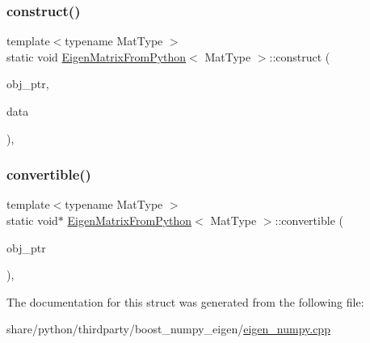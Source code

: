 \subsubsection{\texorpdfstring{construct()}{construct()}}
{\footnotesize\ttfamily template$<$typename Mat\+Type $>$ \\
static void \hyperlink{structEigenMatrixFromPython}{Eigen\+Matrix\+From\+Python}$<$ Mat\+Type $>$\+::construct (\begin{DoxyParamCaption}\item[{Py\+Object $\ast$}]{obj\+\_\+ptr,  }\item[{bp\+::converter\+::rvalue\+\_\+from\+\_\+python\+\_\+stage1\+\_\+data $\ast$}]{data }\end{DoxyParamCaption})\hspace{0.3cm}{\ttfamily [inline]}, {\ttfamily [static]}}

\mbox{\label{structEigenMatrixFromPython_a2759081c69a7716b9ee7c7bfab33671c}} 
\subsubsection{\texorpdfstring{convertible()}{convertible()}}
{\footnotesize\ttfamily template$<$typename Mat\+Type $>$ \\
static void$\ast$ \hyperlink{structEigenMatrixFromPython}{Eigen\+Matrix\+From\+Python}$<$ Mat\+Type $>$\+::convertible (\begin{DoxyParamCaption}\item[{Py\+Object $\ast$}]{obj\+\_\+ptr }\end{DoxyParamCaption})\hspace{0.3cm}{\ttfamily [inline]}, {\ttfamily [static]}}



The documentation for this struct was generated from the following file\+:\begin{DoxyCompactItemize}
\item 
share/python/thirdparty/boost\+\_\+numpy\+\_\+eigen/\hyperlink{eigen__numpy_8cpp}{eigen\+\_\+numpy.\+cpp}\end{DoxyCompactItemize}
